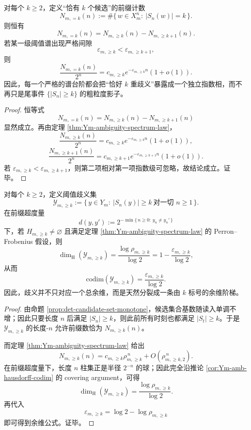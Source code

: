 \begin{corollary}[精确歧义层的暴露相定理]\label{cor:conclusion-exact-k-ambiguity-exposed-phase}
对每个 \(k\ge 2\)，定义“恰有 \(k\) 个候选”的前缀计数
\[
N_{m,=k}(n):=\#\{\,w\in X_m^n:\ |S_n(w)|=k\,\}.
\]
则恒有
\[
N_{m,=k}(n)=N_{m,\ge k}(n)-N_{m,\ge k+1}(n).
\]
若某一级阈值谱出现严格间隙
\[
\varepsilon_{m,\ge k}<\varepsilon_{m,\ge k+1},
\]
则
\[
\frac{N_{m,=k}(n)}{2^n}
=
c_{m,\ge k}e^{-\varepsilon_{m,\ge k}n}(1+o(1)).
\]
因此，每一个严格的谱台阶都会把“恰好 \(k\) 重歧义”暴露成一个独立指数相，而不再只是尾事件 \(\{|S_n|\ge k\}\) 的粗粒度影子。
\end{corollary}
\begin{proof}
恒等式
\[
N_{m,=k}(n)=N_{m,\ge k}(n)-N_{m,\ge k+1}(n)
\]
显然成立。再由定理 \ref{thm:Ym-ambiguity-spectrum-law}，
\[
\frac{N_{m,\ge k}(n)}{2^n}
=
c_{m,\ge k}e^{-\varepsilon_{m,\ge k}n}(1+o(1)),
\]
\[
\frac{N_{m,\ge k+1}(n)}{2^n}
=
c_{m,\ge k+1}e^{-\varepsilon_{m,\ge k+1}n}(1+o(1)).
\]
若 \(\varepsilon_{m,\ge k}<\varepsilon_{m,\ge k+1}\)，则第二项相对第一项指数级可忽略，故结论成立。证毕。
\end{proof}

\begin{theorem}\label{thm:conclusion-threshold-ambiguity-hausdorff-codim-ladder}
对每个 \(k\ge 2\)，定义阈值歧义集
\[
\mathcal Y_{m,\ge k}:=
\{\,y\in Y_m:\ |S_n(y)|\ge k\ \text{对一切 }n\ge 1\,\}.
\]
在前缀超度量
\[
d(y,y'):=2^{-\min\{\,n\ge 0:\ y_n\neq y_n'\,\}}
\]
下，若 \(H_{m,\ge k}\neq\varnothing\) 且满足定理 \ref{thm:Ym-ambiguity-spectrum-law} 的 Perron--Frobenius 假设，则
\[
\dim_{\mathrm H}(\mathcal Y_{m,\ge k})
=
\frac{\log\rho_{m,\ge k}}{\log 2}
=
1-\frac{\varepsilon_{m,\ge k}}{\log 2},
\]
从而
\[
\mathrm{codim}(\mathcal Y_{m,\ge k})
=
\frac{\varepsilon_{m,\ge k}}{\log 2}.
\]
因此，歧义并不只对应一个总余维，而是天然分裂成一条由 \(k\) 标号的余维阶梯。
\end{theorem}
\begin{proof}
由命题 \ref{prop:det-candidate-set-monotone}，候选集合基数随读入单调不增；因此只要长度 \(n\) 后满足 \(|S_n|\ge k\)，则此前所有时刻也都满足 \(|S_t|\ge k\)。于是 \(\mathcal Y_{m,\ge k}\) 的长度-\(n\) 允许前缀数恰为 \(N_{m,\ge k}(n)\)。

而定理 \ref{thm:Ym-ambiguity-spectrum-law} 给出
\[
N_{m,\ge k}(n)=c_{m,\ge k}\rho_{m,\ge k}^{\,n}+O(\rho_{m,\ge k,2}^{\,n}).
\]
在前缀超度量下，长度 \(n\) 柱集正是半径 \(2^{-n}\) 的球；因此完全沿推论 \ref{cor:Ym-amb-hausdorff-codim} 的 covering argument，可得
\[
\dim_{\mathrm H}(\mathcal Y_{m,\ge k})=\frac{\log\rho_{m,\ge k}}{\log 2}.
\]
再代入
\[
\varepsilon_{m,\ge k}=\log 2-\log\rho_{m,\ge k}
\]
即可得到余维公式。证毕。
\end{proof}

